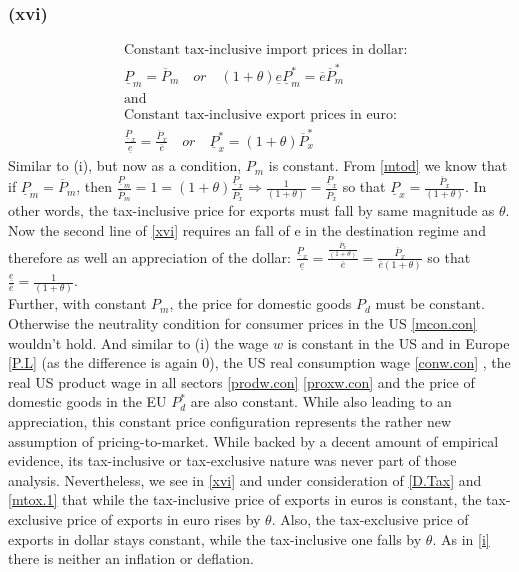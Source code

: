 \subsubsection*{(xvi)}
\begin{equation}\label{xvi}
\begin{aligned}
&\text{Constant tax-inclusive import prices in dollar:}\\ &\underline P_m = \overline P_m \quad or \quad (1+\theta)\underline e \underline P^*_m  = \overline e \overline P^*_m\\
&\text{and}\\
&\text{Constant tax-inclusive export prices in euro:}\\ &\frac{\underline P_x}{\underline e } = \frac{\overline P_x}{\overline e} \quad or \quad  \underline P^*_x = (1+\theta)\overline P^*_x 
\end{aligned}
\end{equation}
Similar to (i), but now as a condition, $P_m$ is constant. From \eqref{mtod} we know that if $\underline P_m = \overline P_m$, then $\frac{\underline P_m}{\overline P_m} = 1 = (1+\theta)\frac{\underline P_x}{\overline P_x} \Rightarrow \frac{1}{(1+\theta)} = \frac{\underline P_x}{\overline P_x}$ so that $\underline P_x = \frac{\overline P_x}{(1+\theta)}$. In other words, the tax-inclusive price for exports must fall by same magnitude as $\theta$. Now the second line of \eqref{xvi} requires an fall of e in the destination regime and therefore as well an appreciation of the dollar: $\frac{\underline P_x}{\underline e } = \frac{\frac{\overline P_x}{(1+\theta)}}{\overline e} = \frac{\overline P_x}{\overline e (1+\theta)}$ so that $\frac{\underline e}{\overline e} = \frac{1}{(1+\theta)}$.\\
Further, with constant $P_m$, the price for domestic goods $P_d$ must be constant. Otherwise the neutrality condition for consumer prices in the US \eqref{mcon.con} wouldn't hold. And similar to (i) the wage $w$ is constant in the US and in Europe \eqref{P.L} (as the difference is again 0), the US real consumption wage \eqref{conw.con} , the real US product wage in all sectors \eqref{prodw.con} \eqref{proxw.con} and the price of domestic goods in the EU $P_d^*$ are also constant. While also leading to an appreciation, this constant price configuration represents the rather new assumption of pricing-to-market. While backed by a decent amount of empirical evidence, its tax-inclusive or tax-exclusive nature was never part of those analysis. Nevertheless, we see in \eqref{xvi} and under consideration of \eqref{D.Tax} and \eqref{mtox.1} that while the tax-inclusive price of exports in euros is constant, the tax-exclusive price of exports in euro rises by $\theta$. Also, the tax-exclusive price of exports in dollar stays constant, while the tax-inclusive one falls by $\theta$. As in \eqref{i} there is neither an inflation or deflation. 

